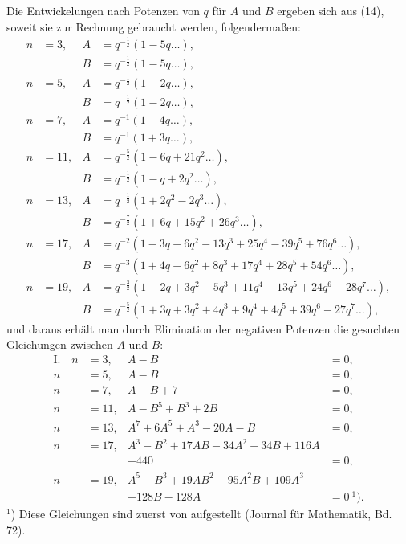 Die Entwickelungen nach Potenzen von $q$ für $A$ und $B$ ergeben
sich aus (14), soweit sie zur Rechnung gebraucht werden,
folgendermaßen:
\[
\begin{aligned}
n &= 3, & A &= q^{-\frac{1}{2}}(1 - 5q \dots), \\
& & B &= q^{-\frac{1}{2}}(1 - 5q \dots), \\
n &= 5, & A &= q^{-\frac{1}{2}}(1 - 2q \dots), \\
& & B &= q^{-\frac{1}{2}}(1 - 2q \dots), \\
n &= 7, & A &= q^{-1}(1 - 4q \dots), \\
& & B &= q^{-1}(1 + 3q \dots), \\
n &= 11, & A &= q^{-\frac{5}{2}}(1 - 6q + 21q^2 \dots), \\
& & B &= q^{-\frac{1}{2}}(1 - q + 2q^2 \dots), \\
n &= 13, & A &= q^{-\frac{1}{2}}(1 + 2q^2 - 2q^3 \dots), \\
& & B &= q^{-\frac{7}{2}}(1 + 6q + 15q^2 + 26q^3 \dots), \\
n &= 17, & A &= q^{-2}(1 - 3q + 6q^2 - 13q^3 + 25q^4 - 39q^5 + 76q^6 \dots), \\
& & B &= q^{-3}(1 + 4q + 6q^2 + 8q^3 + 17q^4 + 28q^5 + 54q^6 \dots), \\
n &= 19, & A &= q^{-\frac{3}{2}}(1 - 2q + 3q^2 - 5q^3 + 11q^4 - 13q^5 + 24q^6 - 28q^7 \dots), \\
& & B &= q^{-\frac{5}{2}}(1 + 3q + 3q^2 + 4q^3 + 9q^4 + 4q^5 + 39q^6 - 27q^7 \dots),
\end{aligned}
\]
und daraus erhält man durch Elimination der negativen Potenzen
die gesuchten Gleichungen zwischen $A$ und $B$:
\[
\begin{aligned}
\text{I.}\quad n &= 3, & A - B &= 0, \\
n &= 5, & A - B &= 0, \\
n &= 7, & A - B + 7 &= 0, \\
n &= 11, & A - B^5 + B^3 + 2B &= 0, \\
n &= 13, & A^7 + 6A^5 + A^3 - 20A - B &= 0, \\
n &= 17, & A^3 - B^2 + 17AB - 34A^2 + 34B + 116A \\
& & + 440 &= 0, \\
n &= 19, & A^5 - B^3 + 19AB^2 - 95A^2B + 109A^3 \\
& & + 128B - 128A &= 0\ ^{1}).
\end{aligned}
\]
$^{1}$) Diese Gleichungen sind zuerst von  aufgestellt (Journal für
Mathematik, Bd. 72).

